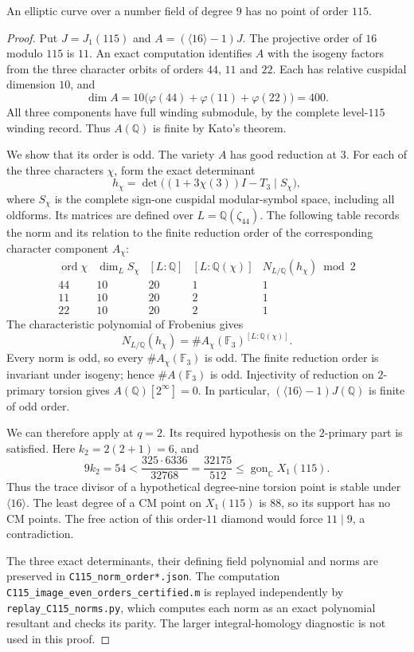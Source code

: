 \begin{proposition}\label{prop:nonic-no115}
An elliptic curve over a number field of degree $9$ has no point of order $115$.
\end{proposition}
\begin{proof}
Put $J=J_1(115)$ and $A=(\langle16\rangle-1)J$.
The projective order of $16$ modulo $115$ is $11$.
An exact computation identifies $A$ with the isogeny factors from the
three character orbits of orders $44$, $11$ and $22$.
Each has relative cuspidal dimension $10$, and
\[
 \dim A=10\bigl(\varphi(44)+\varphi(11)+\varphi(22)\bigr)=400.
\]
All three components have full winding submodule, by the complete
level-$115$ winding record. Thus $A(\mathbb Q)$ is finite by Kato's theorem.

We show that its order is odd. The variety $A$ has good reduction at $3$.
For each of the three characters $\chi$, form the exact determinant
\[
 h_\chi=\det\bigl((1+3\chi(3))I-T_3\mid S_\chi\bigr),
\]
where $S_\chi$ is the complete sign-one cuspidal modular-symbol space,
including all oldforms. Its matrices are defined over
$L=\mathbb Q(\zeta_{44})$. The following table records the norm and
its relation to the finite reduction order of the corresponding
character component $A_\chi$:
\[
\begin{array}{r|r|r|r|c}
 \operatorname{ord}\chi&\dim_L S_\chi&[L:\mathbb Q]&
 [L:\mathbb Q(\chi)]&N_{L/\mathbb Q}(h_\chi)\bmod2\\\hline
 44&10&20&1&1\\
 11&10&20&2&1\\
 22&10&20&2&1
\end{array}
\]
The characteristic polynomial of Frobenius gives
\[
 N_{L/\mathbb Q}(h_\chi)
 =\#A_\chi(\mathbb F_3)^{[L:\mathbb Q(\chi)]}.
\]
Every norm is odd, so every $\#A_\chi(\mathbb F_3)$ is odd.
The finite reduction order is invariant under isogeny; hence
$\#A(\mathbb F_3)$ is odd. Injectivity of reduction on $2$-primary
torsion gives $A(\mathbb Q)[2^\infty]=0$.
In particular, $(\langle16\rangle-1)J(\mathbb Q)$ is finite of odd order.

We can therefore apply \cite[Proposition~4.4]{DN} at $q=2$.
Its required hypothesis on the $2$-primary part is satisfied.
Here $k_2=2(2+1)=6$, and
\[
 9k_2=54<\frac{325\cdot6336}{32768}
       =\frac{32175}{512}
       \leq\operatorname{gon}_{\mathbb C}X_1(115).
\]
Thus the trace divisor of a hypothetical degree-nine torsion point
is stable under $\langle16\rangle$. The least degree of a CM point
on $X_1(115)$ is $88$, so its support has no CM points.
The free action of this order-$11$ diamond would force $11\mid9$,
a contradiction.

The three exact determinants, their defining field polynomial and
norms are preserved in \texttt{C115\_norm\_order*.json}.
The computation \texttt{C115\_image\_even\_orders\_certified.m}
is replayed independently by \texttt{replay\_C115\_norms.py}, which
computes each norm as an exact polynomial resultant and checks its parity.
The larger integral-homology diagnostic is not used in this proof.
\end{proof}
